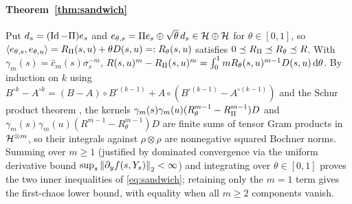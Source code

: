 \paragraph{Theorem~\ref{thm:sandwich}}
Put $d_s=(\operatorname{Id}-\Pi)e_s$ and $e_{\theta,s}=\Pi e_s\oplus\sqrt{\theta}\,d_s\in\mathcal{H}\oplus\mathcal{H}$ for
$\theta\in[0,1]$, so $\left\langle e_{\theta,s},e_{\theta,u}\right\rangle=R_\Pi(s,u)+\theta D(s,u)=:R_\theta(s,u)$ satisfies
$0\preceq R_\Pi\preceq R_\theta\preceq R$. With $\gamma_m(s)=\hat c_m(s)\sigma_s^{-m}$,
$R(s,u)^m-R_\Pi(s,u)^m=\int_0^1 m R_\theta(s,u)^{m-1}D(s,u)\,\mathrm{d}\theta$. By induction on $k$ using
$B^{\circ k}-A^{\circ k}=(B-A)\circ B^{\circ(k-1)}+A\circ(B^{\circ(k-1)}-A^{\circ(k-1)})$ and the
Schur product theorem \citep{Schur1911}, the kernels
$\gamma_m(s)\gamma_m(u)(R_\theta^{m-1}-R_\Pi^{m-1})D$ and $\gamma_m(s)\gamma_m(u)(R^{m-1}-R_\theta^{m-1})D$
are finite sums of tensor Gram products in $\mathcal{H}^{\otimes m}$, so their integrals against $\rho\otimes\rho$
are nonnegative squared Bochner norms. Summing over $m\ge1$ (justified by dominated convergence via the
uniform derivative bound $\sup_s\left\lVert \partial_y f(s,Y_s)\right\rVert_2<\infty$) and integrating over $\theta\in[0,1]$
proves the two inner inequalities of \eqref{eq:sandwich}; retaining only the $m=1$ term gives the
first-chaos lower bound, with equality when all $m\ge2$ components vanish.


